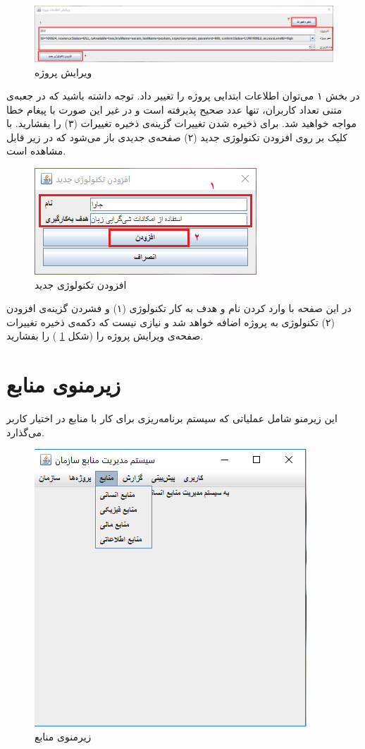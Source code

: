 \begin{figure}[H]
	\centering
	\includegraphics[scale=0.5]{img/manual/editProject}
	\caption{ویرایش پروژه}
	\label{f6}
\end{figure}
در بخش ۱ می‌توان اطلاعات ابتدایی پروژه را تغییر داد. توجه داشته باشید که در جعبه‌ی متنی تعداد کاربران، تنها عدد صحیح پذیرفته است و در غیر این صورت با پیغام خطا مواجه خواهید شد.  برای ذخیره شدن تغییرات گزینه‌ی ذخیره تغییرات (۳) را بفشارید. با کلیک بر روی افزودن تکنولوژی جدید (۲) صفحه‌ی جدیدی باز می‌شود که در زیر قابل مشاهده است.
\begin{figure}[H]
	\centering
	\includegraphics[scale=0.7]{img/manual/addTech}
	\caption{ افزودن تکنولوژی جدید}
	\label{f7}
\end{figure}
در این صفحه با وارد کردن نام و هدف به کار تکنولوژی (۱) و فشردن گزینه‌ی افزودن (۲) تکنولوژی به پروژه اضافه خواهد شد و نیازی نیست که دکمه‌ی ذخیره تغییرات صفحه‌ی ویرایش پروژه را (شکل
\ref{f6}
)
را بفشارید.

\newpage
\section{زیرمنوی منابع}
این زیرمنو شامل عملیاتی که سیستم برنامه‌ریزی برای کار با منابع در اختیار کاربر می‌گذارد.

	\begin{figure}[H]
		\centering
		\includegraphics[scale=0.7]{img/manual/resSubmenu}
		\caption{زیرمنوی منابع}
	\end{figure}

